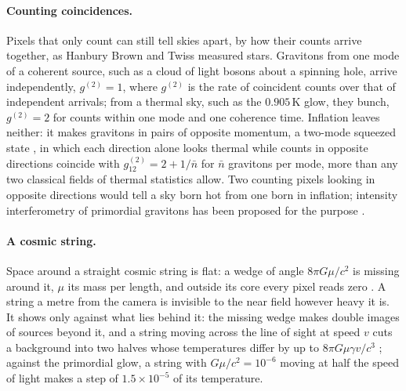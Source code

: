 \paragraph{Counting coincidences.} Pixels that only count can still tell
skies apart, by how their counts arrive together, as Hanbury Brown and Twiss
measured stars. Gravitons from one mode of a coherent source, such as a cloud
of light bosons about a spinning hole, arrive independently, $g^{(2)} = 1$,
where $g^{(2)}$ is the rate of coincident counts over that of independent
arrivals;
from a thermal sky, such as the $0.905\,\mathrm{K}$ glow, they bunch,
$g^{(2)} = 2$ for counts within one mode and one coherence time. Inflation leaves neither: it makes gravitons in pairs of
opposite momentum, a two-mode squeezed state
\cite{GrishchukSidorov1990}, in which each direction alone looks thermal while
counts in opposite directions coincide with $g^{(2)}_{12} = 2 + 1/\bar n$ for
$\bar n$ gravitons per mode, more than any two classical fields of thermal statistics allow. Two
counting pixels looking in opposite directions would tell a sky born hot from
one born in inflation; intensity interferometry of primordial gravitons has
been proposed for the purpose \cite{KannoSoda2019}.

\paragraph{A cosmic string.} Space around a straight
cosmic string is flat: a wedge of angle $8\pi G\mu/c^2$ is missing around it,
$\mu$ its mass per length, and outside its core every pixel reads zero
\cite{Vilenkin1981}. A string a metre from the camera is invisible to the near
field however heavy it is. It shows only against what lies behind it: the
missing wedge makes double images of sources beyond it, and a string moving
across the line of sight at speed $v$ cuts a background into two halves whose
temperatures differ by up to $8\pi G\mu\gamma v/c^3$ \cite{KaiserStebbins1984};
against the primordial glow, a string with $G\mu/c^2 = 10^{-6}$ moving at half
the speed of light makes a step of $1.5\times10^{-5}$ of its temperature.

